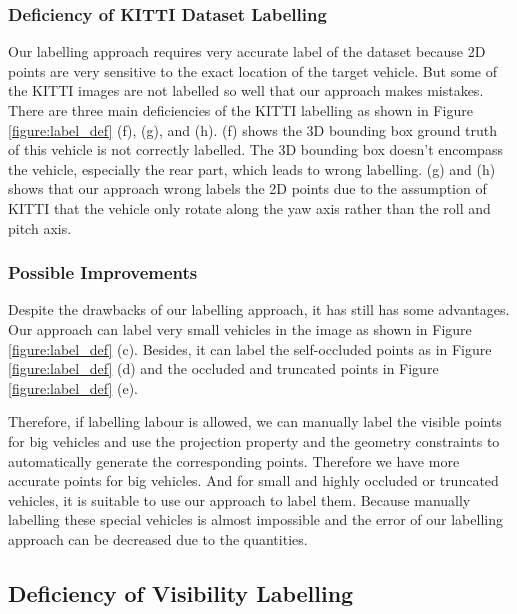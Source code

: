 \subsubsection{Deficiency of KITTI Dataset Labelling}
Our labelling approach requires very accurate label of the dataset because 2D points are very sensitive to the exact location of the target vehicle. But some of the KITTI images are not labelled so well that our approach makes mistakes. There are three main deficiencies of the KITTI labelling as shown in Figure \ref{figure:label_def} (f), (g), and (h). (f) shows the 3D bounding box ground truth of this vehicle is not correctly labelled. The 3D bounding box doesn't encompass the vehicle, especially the rear part, which leads to wrong labelling. (g) and (h) shows that our approach wrong labels the 2D points due to the assumption of KITTI that the vehicle only rotate along the yaw axis rather than the roll and pitch axis.


\subsubsection{Possible Improvements}
Despite the drawbacks of our labelling approach, it has still has some advantages. Our approach can label very small vehicles in the image as shown in Figure \ref{figure:label_def} (c). Besides, it can label the self-occluded points as in Figure \ref{figure:label_def} (d) and the occluded and truncated points in Figure \ref{figure:label_def} (e). 

Therefore, if labelling labour is allowed, we can manually label the visible points for big vehicles and use the projection property and the geometry constraints to automatically generate the corresponding points. Therefore we have more accurate points for big vehicles. And for small and highly occluded or truncated vehicles, it is suitable to use our approach to label them. Because manually labelling these special vehicles is almost impossible and the error of our labelling approach can be decreased due to the quantities.


\subsection{Deficiency of Visibility Labelling}
